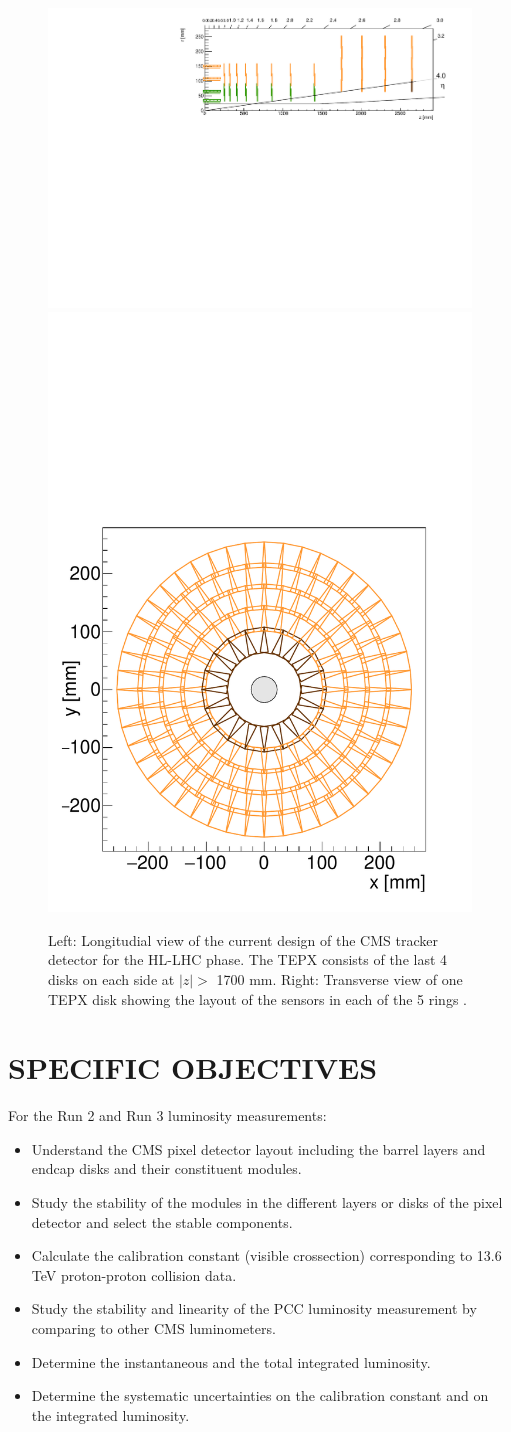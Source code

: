 \documentclass[final,12p]{article}
\begin{document}
\begin{figure}[H]
  \centering
  \includegraphics[width=0.7\columnwidth]{./TEPX_rz.pdf}
  \includegraphics[width=0.27\columnwidth]{./TEPX_rphi.pdf}
  \caption{
    Left: Longitudial view of the current design of the CMS tracker detector for the HL-LHC phase. The TEPX consists of the last 4 disks on each side at $|z|>$ 1700 mm.
    Right: Transverse view of one TEPX disk showing the layout of the sensors in each of the 5 rings \cite{Klein:2017nke}.
  }
  \label{fig:tepx}
\end{figure}



\section{SPECIFIC OBJECTIVES}

For the Run 2 and Run 3 luminosity measurements:
\begin{itemize}
\item Understand the CMS pixel detector layout including the barrel layers and endcap disks and their constituent modules.
\item Study the stability of the modules in the different layers or disks of the pixel detector and select the stable components.
\item Calculate the calibration constant (visible crossection) corresponding to 13.6 TeV proton-proton collision data.
\item Study the stability and linearity of the PCC luminosity measurement by comparing to other CMS luminometers.
\item Determine the instantaneous and the total integrated luminosity.
\item Determine the systematic uncertainties on the calibration constant and on the integrated luminosity.
\end{itemize}
\end{document}
